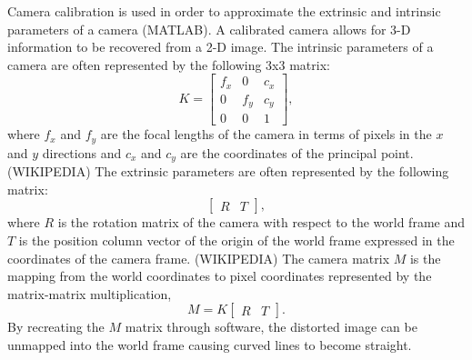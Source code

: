 \documentclass[arbeit=studie,oneside,BCOR=12mm]{ArbeitRST}
\begin{document}
Camera calibration is used in order to approximate the extrinsic and intrinsic
parameters of a camera (MATLAB). A calibrated camera allows for 3-D information
to be recovered from a 2-D image. The intrinsic parameters of a camera are
often represented by the following 3x3 matrix:
\begin{equation}
  K = 
  \begin{bmatrix} 
    f_x & 0 & c_x\\ 
    0 & f_y & c_y\\
    0 & 0 & 1 
  \end{bmatrix},
\end{equation}
where $f_x$ and $f_y$ are the focal lengths of the camera in terms of pixels in
the $x$ and $y$ directions and $c_x$ and $c_y$ are the coordinates of the
principal point. (WIKIPEDIA) The extrinsic parameters are often represented by
the following matrix: 
\begin{equation}
  \begin{bmatrix}
    R & T
  \end{bmatrix},
\end{equation}
where $R$ is the rotation matrix of the camera with respect to the world frame
and $T$ is the position column vector of the origin of the world frame
expressed in the coordinates of the camera frame. (WIKIPEDIA) The camera matrix
$M$ is the mapping from the world coordinates to pixel coordinates
represented by the matrix-matrix multiplication,
\begin{equation}
  M = K 
  \begin{bmatrix}
    R & T
  \end{bmatrix}.
\end{equation}
By recreating the $M$ matrix through software, the distorted image can be
unmapped into the world frame causing curved lines to become straight.
\end{document}
